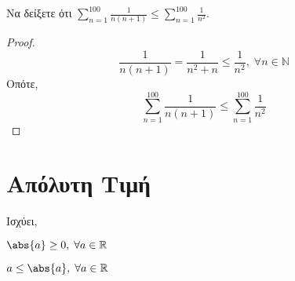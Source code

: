 \documentclass[main.tex]{subfiles}
\begin{document}
\begin{example}
    Να δείξετε ότι $ \sum_{n=1}^{100} \frac{1}{n(n+1)} \leq \sum_{n=1}^{100}
    \frac{1}{n^{2}} $.
\end{example}

\begin{proof}
    \[
        \frac{1}{n(n+1)} = \frac{1}{n^{2}+n} \leq \frac{1}{n^{2}} ,\; 
        \forall n \in \mathbb{N} 
    \] 
    Οπότε,
    \[
        \sum_{n=1}^{100} \frac{1}{n(n+1)} \leq \sum_{n=1}^{100} 
        \frac{1}{n^{2}}
    \]
\end{proof}

\section{Απόλυτη Τιμή}


\begin{rem}
    Ισχύει, 
    \begin{myitemize}
        \item  $ \abs{a} \geq 0, \;  \forall a \in \mathbb{R} $
        \item $ a \leq \abs{a}, \; \forall a \in \mathbb{R} $
    \end{myitemize}
\end{rem}

\end{document}
